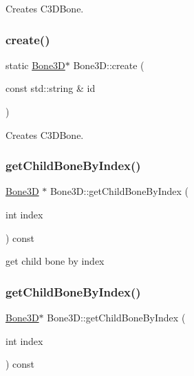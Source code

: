 Creates C3\+D\+Bone. \mbox{\label{classBone3D_aa22fa6c00c3c8600309c67917db36481}} 
\subsubsection{\texorpdfstring{create()}{create()}\hspace{0.1cm}{\footnotesize\ttfamily [2/2]}}
{\footnotesize\ttfamily static \hyperlink{classBone3D}{Bone3D}$\ast$ Bone3\+D\+::create (\begin{DoxyParamCaption}\item[{const std\+::string \&}]{id }\end{DoxyParamCaption})\hspace{0.3cm}{\ttfamily [static]}}

Creates C3\+D\+Bone. \mbox{\label{classBone3D_a0d6ff6c15e5f8ed01ffeeb60bf3b7cd0}} 
\subsubsection{\texorpdfstring{get\+Child\+Bone\+By\+Index()}{getChildBoneByIndex()}\hspace{0.1cm}{\footnotesize\ttfamily [1/2]}}
{\footnotesize\ttfamily \hyperlink{classBone3D}{Bone3D} $\ast$ Bone3\+D\+::get\+Child\+Bone\+By\+Index (\begin{DoxyParamCaption}\item[{int}]{index }\end{DoxyParamCaption}) const}

get child bone by index \mbox{\label{classBone3D_a92d362cde5c05727ed182ae254bdd946}} 
\subsubsection{\texorpdfstring{get\+Child\+Bone\+By\+Index()}{getChildBoneByIndex()}\hspace{0.1cm}{\footnotesize\ttfamily [2/2]}}
{\footnotesize\ttfamily \hyperlink{classBone3D}{Bone3D}$\ast$ Bone3\+D\+::get\+Child\+Bone\+By\+Index (\begin{DoxyParamCaption}\item[{int}]{index }\end{DoxyParamCaption}) const}

